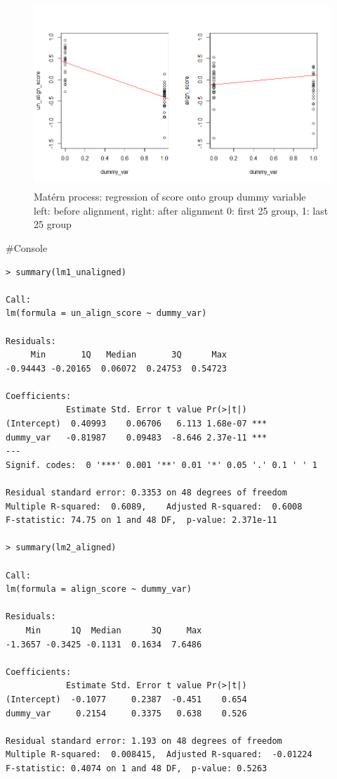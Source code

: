 \documentclass{article}
\newenvironment{console}%
{%
    \begin{mdframed}
    \#Console
    \begin{small}
}
{%
    \end{small}
    \end{mdframed}
}
\begin{document}
\begin{figure}[hh]
    \centering
    \includegraphics[height=7cm]{matern_score_reg.png}
    \caption{Mat\'{e}rn process: regression of score onto group dummy variable\\
    left: before alignment, right: after alignment
    0: first 25 group, 1: last 25 group
    }
\end{figure}
\begin{console}
    \begin{verbatim}
> summary(lm1_unaligned)

Call:
lm(formula = un_align_score ~ dummy_var)

Residuals:
     Min       1Q   Median       3Q      Max
-0.94443 -0.20165  0.06072  0.24753  0.54723

Coefficients:
            Estimate Std. Error t value Pr(>|t|)
(Intercept)  0.40993    0.06706   6.113 1.68e-07 ***
dummy_var   -0.81987    0.09483  -8.646 2.37e-11 ***
---
Signif. codes:  0 '***' 0.001 '**' 0.01 '*' 0.05 '.' 0.1 ' ' 1

Residual standard error: 0.3353 on 48 degrees of freedom
Multiple R-squared:  0.6089,    Adjusted R-squared:  0.6008
F-statistic: 74.75 on 1 and 48 DF,  p-value: 2.371e-11

> summary(lm2_aligned)

Call:
lm(formula = align_score ~ dummy_var)

Residuals:
    Min      1Q  Median      3Q     Max
-1.3657 -0.3425 -0.1131  0.1634  7.6486

Coefficients:
            Estimate Std. Error t value Pr(>|t|)
(Intercept)  -0.1077     0.2387  -0.451    0.654
dummy_var     0.2154     0.3375   0.638    0.526

Residual standard error: 1.193 on 48 degrees of freedom
Multiple R-squared:  0.008415,  Adjusted R-squared:  -0.01224
F-statistic: 0.4074 on 1 and 48 DF,  p-value: 0.5263
    \end{verbatim}
\end{console}
\end{document}
